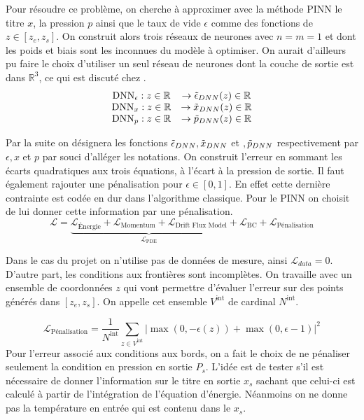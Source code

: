 Pour résoudre ce problème, on cherche à approximer avec la méthode PINN le titre $x$, la pression $p$ ainsi que le taux de vide $\epsilon$ comme des fonctions de $z \in [z_e,z_s]$. On construit alors trois réseaux de neurones avec $n=m=1$ et dont les poids et biais sont les inconnues du modèle à optimiser. On aurait d'ailleurs pu faire le choix d'utiliser un seul réseau de neurones dont la couche de sortie est dans $\mathbb{R}^3$, ce qui est discuté chez \cite{haghighatDeepLearningFramework2020}.\\
\begin{equation}
    \begin{array}{cc}
        \text{DNN}_{\epsilon} : z \in \mathbb{R} & \rightarrow \Tilde{\epsilon}_{DNN}(z) \in \mathbb{R}  \\
        \text{DNN}_{x} : z \in \mathbb{R} & \rightarrow \Tilde{x}_{DNN}(z) \in \mathbb{R}  \\
        \text{DNN}_{p} : z \in \mathbb{R} & \rightarrow \Tilde{p}_{DNN}(z) \in \mathbb{R} 
    \end{array}
\end{equation}

Par la suite on désignera les fonctions $\Tilde{\epsilon}_{DNN} , \Tilde{x}_{DNN}$ et $, \Tilde{p}_{DNN}$ respectivement par $\epsilon,x$ et $p$ par souci d'alléger les notations. On construit l'erreur en sommant les écarts quadratiques aux trois équations, à l'écart à la pression de sortie. Il faut également rajouter une pénalisation pour $\epsilon \in [0,1]$. En effet cette dernière contrainte est codée en dur dans l'algorithme classique. Pour le PINN on choisit de lui donner cette information par une pénalisation.\\

\begin{equation}
    \mathcal{L} = \underbrace{\mathcal{L}_{\text{Énergie}} + \mathcal{L}_{\text{Momentum}} + \mathcal{L}_{\text{Drift Flux Model}}}_{\mathcal{L}_{\text{PDE}}} + \mathcal{L}_{\text{BC}} + \mathcal{L}_{\text{Pénalisation}}
\end{equation}

Dans le cas du projet on n'utilise pas de données de mesure, ainsi $\mathcal{L}_{data} = 0$. D'autre part, les conditions aux frontières sont incomplètes. On travaille avec un ensemble de coordonnées $z$ qui vont permettre d'évaluer l'erreur sur des points générés dans $[z_e,z_s]$. On appelle cet ensemble $V^{\text{int}}$ de cardinal $N^{\text{int}}$.

\begin{equation}
    \mathcal{L}_{\text{Pénalisation}} = \frac{1}{N^{\text{int}}}\sum_{z\in V^{\text{int}}} \left| \max(0,-\epsilon(z)) + \max(0,\epsilon-1) \right|^2
\end{equation}
Pour l'erreur associé aux conditions aux bords, on a fait le choix de ne pénaliser seulement la condition en pression en sortie $P_s$. L'idée est de tester s'il est nécessaire de donner l'information sur le titre en sortie $x_s$ sachant que celui-ci est calculé à partir de l'intégration de l'équation d'énergie. Néanmoins on ne donne pas la température en entrée qui est contenu dans le $x_s$.

